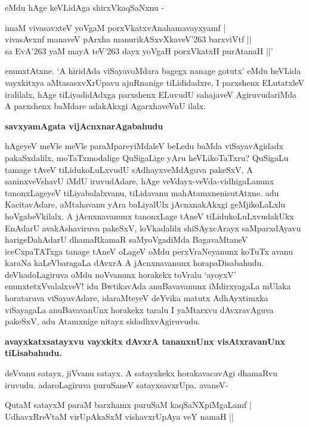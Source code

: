 \noindent
eMdu hAge keVLidAga shirxVkaqSaNxnu -

\begin{shloka}
imaM vivasavxteV yoVgaM porxVkatxvAnahamavayxyamf |\\\label{107a}
vivasAvxnf manaveV pArxha manurikASxvXkaveV\char'263 barxviVtf ||\\
sa EvA\char'263 yaM mayA teV\char'263 dayx yoVgaH porxVkatxH purAtanaH ||'\label{107b}
\end{shloka}

\noindent
enunxtAtxne. `A hiridAda viSayavoMdara bagegx nanage gotutx' eMdu heVLida vayxkitxya aMtasasxvXrUpavu ajuRnanige tiLididadxre, I parxshenx ELutatxleV iralilalx, hAge tiLiyadidAdxga parxshenx ELuvudU sahajaveV  AgiruvudariMda A parxshenx baMdare adakAkxgi AgarxhaveVnU ilalx.

{\bigskip
\noindent
{\large\bf savxyamAgata vijAcnxnarAgabahudu}}\label{page107a}
\medskip

\noindent
hAgeyeV meVle meVle paraMpareyiMdaleV beLedu baMda viSayavAgidadx pakaSxdalilx, moTaTxmodalige QuSigaLige yAru heVLikoTaTxru? QuSigaLu tamage tAveV tiLidukoLuLxvudU sAdhayxveMdAguva pakeSxV, A saninxveVshavU iMdU iruvudAdare, hAge veVdayx-veVda-vidhigaLanunx tanonxLageyeV tiLiyabalalxvanu, tiLidavanu mahAtamxnenisutAtxne. adu KacitavAdare, aMtahavanu yAra baLiyalUlx jAcnxnakAkxgi geMjikoLaLxlu hoVgabeVkilalx. A jAcnxnavanunx tanonxLage tAneV tiLidukoLuLxvudakUkx EnAdarU avakAshaviruva pakeSxV, loVkadalilx shiSAyxcArayx saMparxdAyavu harigeDahAdarU dhamaRkamaR saMyoVgadiMda BagavaMtaneV iceCxpaTATxga tanage tAneV oLageV oMdu perxVraNeyanunx koTuTx avanu karaNa kaLeVbaragaLa dAvxrA A jAcnxnavanunx horapaDisabahudu. deVhadoLagiruva oMdu noVvanunx horakekx toVralu `ayoyxV' enunxtetxVvalalxveV! idu BwtikavAda anuBavavanunx iMdirxyagaLa mUlaka horataruva viSayavAdare, idaraMteyeV deYvika matutx AdhAyxtimxka viSayagaLa anuBavavanUnx horakekx taralu I yaMtarxvu dAvxravAguva pakeSxV, adu Atamxnige nitayx sidadhxvAgiruvudu.

{\bigskip
\noindent
{\large\bf avayxkatxsatayxvu vayxkitx dAvxrA tananxnUnx visAtxravanUnx tiLisabahudu.}}\label{page108}
\medskip

\noindent
deVvanu satayx, jiVvanu satayx. A satayxkekx horakavacavAgi dhamaRvu iruvudu. adaroLagiruva puruSaneV satayxsavxrUpa. avaneV-

\begin{shloka}
QutaM satayxM paraM barxhamx puruSaM kaqSaNXpiMgaLamf |\\\label{108}
UdhavxRreVtaM virUpAkaSxM vishavxrUpAya veY namaH ||
\end{shloka}

